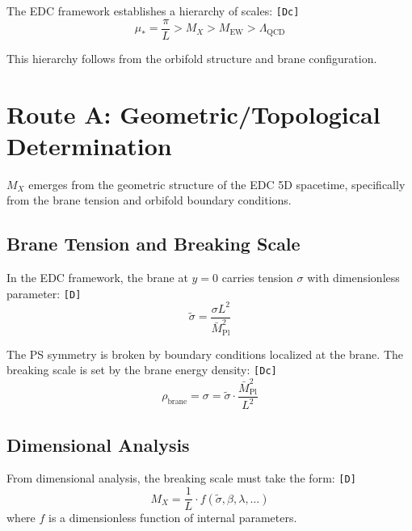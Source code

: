 \documentclass[11pt,a4paper]{article}
\newcommand{\tagD}{\textcolor{green!50!black}{\texttt{[D]}}}
\newcommand{\tagDc}{\textcolor{blue!70!black}{\texttt{[Dc]}}}
\theoremstyle{definition}
\begin{document}
The EDC framework establishes a hierarchy of scales: \tagDc{}
\begin{equation}
\label{eq:scale-hierarchy}
\boxed{\mu_* = \frac{\pi}{L} > M_X > M_{\text{EW}} > \Lambda_{\text{QCD}}}
\end{equation}

This hierarchy follows from the orbifold structure and brane configuration.

\section{Route A: Geometric/Topological Determination}
\label{sec:route-a}

\begin{routebox}
$M_X$ emerges from the geometric structure of the EDC 5D spacetime,
specifically from the brane tension and orbifold boundary conditions.
\end{routebox}

\subsection{Brane Tension and Breaking Scale}
\label{subsec:brane-tension}

In the EDC framework, the brane at $y = 0$ carries tension $\sigma$ with
dimensionless parameter: \tagD{}
\begin{equation}
\label{eq:sigma-tilde-def}
\tilde{\sigma} = \frac{\sigma L^2}{\bar{M}_{\text{Pl}}^2}
\end{equation}

The PS symmetry is broken by boundary conditions localized at the brane.
The breaking scale is set by the brane energy density: \tagDc{}
\begin{equation}
\label{eq:brane-energy-density}
\rho_{\text{brane}} = \sigma = \tilde{\sigma} \cdot \frac{\bar{M}_{\text{Pl}}^2}{L^2}
\end{equation}

\subsection{Dimensional Analysis}
\label{subsec:dimensional-route-a}

From dimensional analysis, the breaking scale must take the form: \tagD{}
\begin{equation}
\label{eq:mx-dimensional}
M_X = \frac{1}{L} \cdot f(\tilde{\sigma}, \beta, \lambda, \ldots)
\end{equation}
where $f$ is a dimensionless function of internal parameters.
\end{document}
